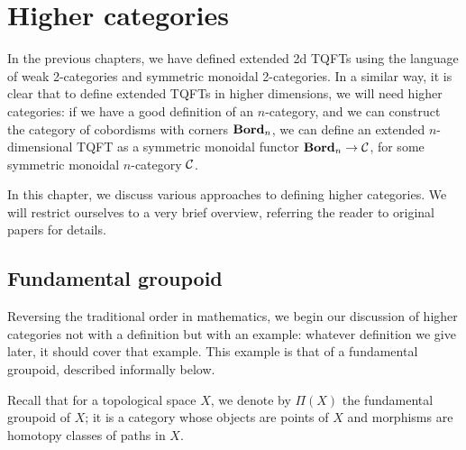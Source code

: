 \chapter{Higher categories}\label{c:higher-cat}

In the previous chapters, we have defined extended 2d TQFTs using
the language of weak 2-categories and symmetric monoidal 2-categories. In a
similar way, it is clear that to define extended TQFTs in higher
dimensions, we will need higher categories: if we have a good definition of
an $n$-category, and we can construct the category of cobordisms with
corners $\mathbf{Bord}_n$, we can define an extended $n$-dimensional TQFT as a
symmetric monoidal functor $\mathbf{Bord}_n\to \mathcal{C}$, for some symmetric monoidal
$n$-category $\mathcal{C}$.

In this chapter, we discuss various approaches to defining higher categories. We
will restrict ourselves to a very brief overview, referring the reader to
original papers for details.




\section{Fundamental groupoid}\label{s:fundamental-groupoid}

Reversing the traditional order in mathematics, we begin our discussion of
higher categories not with a definition but with an example: whatever definition
we give later, it should cover that example. This example is that of a
fundamental groupoid, described informally below.


Recall that for a topological space $X$, we denote by $\Pi(X)$ the fundamental
groupoid of $X$; it is a category whose objects are points of $X$ and morphisms
are homotopy classes of paths in $X$.

